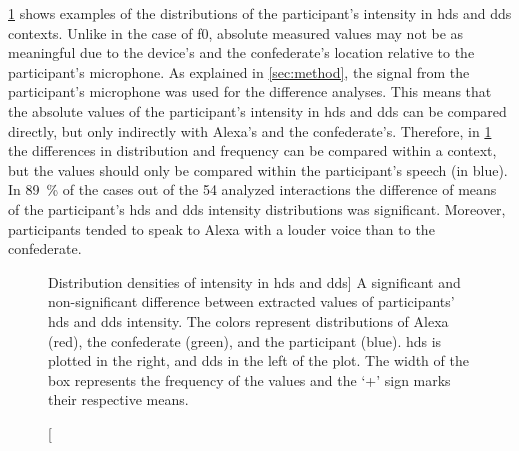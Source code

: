 \cref{fig:hds_dds_violin_intensity_comparison} shows examples of the distributions of the participant's intensity in \ac{hds} and \ac{dds} contexts.
Unlike in the case of \ac{f0}, absolute measured values may not be as meaningful due to the device's and the confederate's location relative to the participant's microphone.
As explained in \cref{sec:method}, the signal from the participant's microphone was used for the difference analyses.
This means that the absolute values of the participant's intensity  in \ac{hds} and \ac{dds} can be compared directly, but only indirectly with Alexa's and the confederate's.
Therefore, in \cref{fig:hds_dds_violin_intensity_comparison} the differences in distribution and frequency can be compared within a context, but the values should only be compared within the participant's speech (in blue).
In \SI{89}{\percent} of the cases out of the 54 analyzed interactions the difference of means of the participant's \ac{hds} and \ac{dds} intensity distributions was significant.
Moreover, participants tended to speak to Alexa with a louder voice than to the confederate.

\begin{figure}[t]
	\centering
	\hfill %
	\caption
	[Distribution densities of intensity in \ac{hds} and \ac{dds}]
	{A significant  and non-significant  difference between extracted values of participants' \ac{hds} and \ac{dds} intensity.
		The colors represent distributions of Alexa (red), the confederate (green), and the participant (blue).
		\ac{hds} is plotted in the right, and \ac{dds} in the left of the plot.
		The width of the box represents the frequency of the values and the \enquote*{+} sign marks their respective means.}
	\label{fig:hds_dds_violin_intensity_comparison}
\end{figure}

